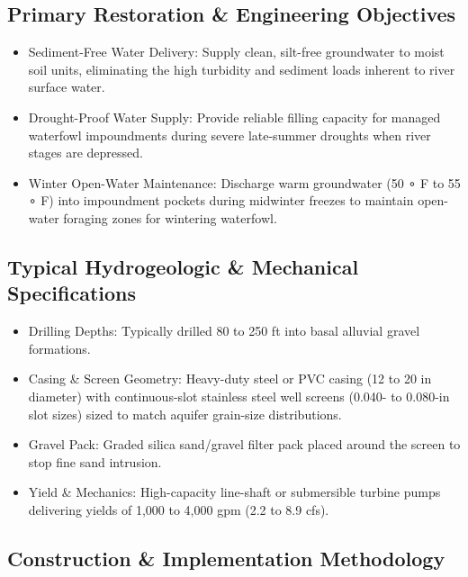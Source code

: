 \documentclass[
  letterpaper,
  DIV=11,
  numbers=noendperiod]{scrreprt}
\begin{document}
\subsection{Primary Restoration \& Engineering
Objectives}\label{primary-restoration-engineering-objectives-14}

\begin{itemize}
\item
  Sediment-Free Water Delivery: Supply clean, silt-free groundwater to
  moist soil units, eliminating the high turbidity and sediment loads
  inherent to river surface water.
\item
  Drought-Proof Water Supply: Provide reliable filling capacity for
  managed waterfowl impoundments during severe late-summer droughts when
  river stages are depressed.
\item
  Winter Open-Water Maintenance: Discharge warm groundwater (50 ∘ F to
  55 ∘ F) into impoundment pockets during midwinter freezes to maintain
  open-water foraging zones for wintering waterfowl.
\end{itemize}

\subsection{Typical Hydrogeologic \& Mechanical
Specifications}\label{typical-hydrogeologic-mechanical-specifications}

\begin{itemize}
\item
  Drilling Depths: Typically drilled 80 to 250 ft into basal alluvial
  gravel formations.
\item
  Casing \& Screen Geometry: Heavy-duty steel or PVC casing (12 to 20 in
  diameter) with continuous-slot stainless steel well screens (0.040- to
  0.080-in slot sizes) sized to match aquifer grain-size distributions.
\item
  Gravel Pack: Graded silica sand/gravel filter pack placed around the
  screen to stop fine sand intrusion.
\item
  Yield \& Mechanics: High-capacity line-shaft or submersible turbine
  pumps delivering yields of 1,000 to 4,000 gpm (2.2 to 8.9 cfs).
\end{itemize}

\subsection{Construction \& Implementation
Methodology}\label{construction-implementation-methodology-15}
\end{document}
